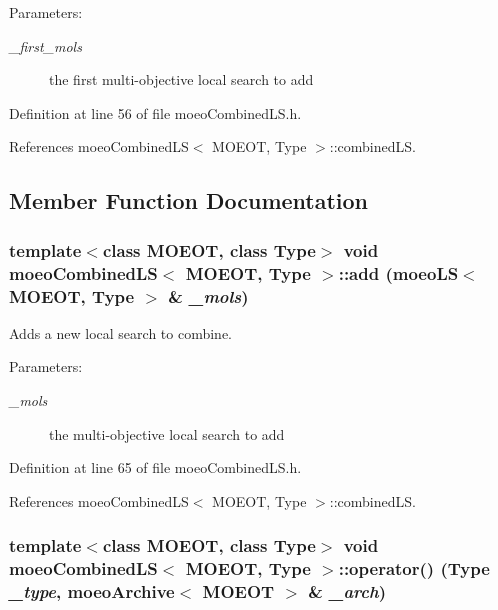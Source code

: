\begin{Desc}
\item[Parameters:]
\begin{description}
\item[{\em \_\-first\_\-mols}]the first multi-objective local search to add \end{description}
\end{Desc}


Definition at line 56 of file moeo\-Combined\-LS.h.

References moeo\-Combined\-LS$<$ MOEOT, Type $>$::combined\-LS.

\subsection{Member Function Documentation}
\subsubsection{\setlength{\rightskip}{0pt plus 5cm}template$<$class MOEOT, class Type$>$ void \bf{moeo\-Combined\-LS}$<$ MOEOT, Type $>$::add (\bf{moeo\-LS}$<$ MOEOT, Type $>$ \& {\em \_\-mols})\hspace{0.3cm}{\tt  [inline]}}\label{classmoeoCombinedLS_1637b4dcf2dd694cc9ffbad605b2bf13}


Adds a new local search to combine. 

\begin{Desc}
\item[Parameters:]
\begin{description}
\item[{\em \_\-mols}]the multi-objective local search to add \end{description}
\end{Desc}


Definition at line 65 of file moeo\-Combined\-LS.h.

References moeo\-Combined\-LS$<$ MOEOT, Type $>$::combined\-LS.
\subsubsection{\setlength{\rightskip}{0pt plus 5cm}template$<$class MOEOT, class Type$>$ void \bf{moeo\-Combined\-LS}$<$ MOEOT, Type $>$::operator() (Type {\em \_\-type}, \bf{moeo\-Archive}$<$ MOEOT $>$ \& {\em \_\-arch})\hspace{0.3cm}{\tt  [inline, virtual]}}\label{classmoeoCombinedLS_634d7fa3092fe8f88a1b54cacfdc35fd}


